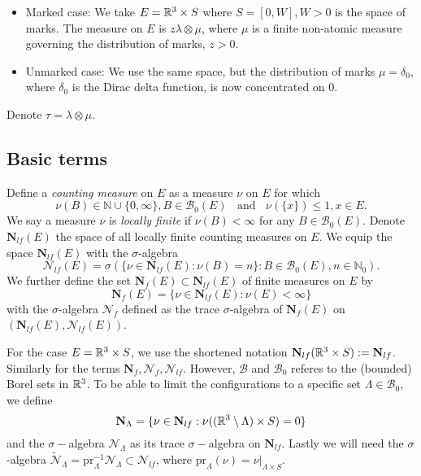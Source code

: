 \begin{itemize}
	\item Marked case: We take $E={\mathbb R^3}\times S$ where $S=[0,W],W>0$ is the space of marks. The measure on $E$ is $z\lambda \otimes \mu$, where $\mu$ is a finite non-atomic measure governing the distribution of marks, $z>0$. 
	\item Unmarked case: We use the same space, but the distribution of marks $\mu=\delta_0$, where $\delta_0$ is the Dirac delta function, is now concentrated on $0$.
\end{itemize}
Denote $\tau = \lambda \otimes \mu$.


\subsection{Basic terms}\label{sec:basicPP}
\begin{definition}\label{def:measures}
Define a \textit{counting measure} on $E$ as a measure $\nu$ on $E$ for which
$$\nu(B)\in\mathbb N \cup \{0,\infty\}, B\in\mathcal B_0(E)\;\;\text{ and } \; \; \nu(\{x\})\leq 1, x\in E.$$
We say a measure $\nu$ is \textit{locally finite} if $\nu(B)<\infty$ for any $B\in \mathcal  B_0(E)$. Denote $\mathbf N_{lf}(E)$ the space of all locally finite counting measures on $E$.
We equip the space $\mathbf N_{lf}(E)$ with the $\sigma$-algebra
$$\mathcal N_{lf}(E)=\sigma(\{\nu \in \mathbf N_{lf}(E): \nu(B)=n\}: B \in \mathcal B_0(E), n\in \mathbb N_0).$$
We further define the set $\mathbf N_f(E) \subset \mathbf N_{lf}(E)$ of finite measures on $E$ by
$$\mathbf N_f(E) = \{\nu \in \mathbf N_{lf}(E): \nu(E)<\infty\}$$
with the $\sigma$-algebra $\mathcal N_{f}$ defined as the trace $\sigma$-algebra of $\mathbf N_{f}(E)$ on $(\mathbf N_{lf}(E),\mathcal N_{lf}(E))$.\newline
\end{definition}

For the case $E={\mathbb R^3}\times S$, we use the shortened notation $\mathbf N_{lf}({\mathbb R^3}\times S) := \mathbf N_{lf}$. Similarly for the terms $\mathbf N_{f}, \mathcal N_{f}, \mathcal N_{lf}$. However, $\mathcal B$ and $\mathcal B_0$ referes to the (bounded) Borel sets in ${\mathbb R^3}$. To be able to limit the configurations to a specific set $\Lambda \in \mathcal B_0$, we define
$$\mathbf N_\Lambda = \{ \nu \in \mathbf N_{lf}: \nu( ({\mathbb R^3} \setminus \Lambda) \times S) = 0 \}$$
and the $\sigma-$algebra $\mathcal N_\Lambda$ as its trace $\sigma-$algebra on $\mathbf N_{lf}$. Lastly we will need the $\sigma$-algebra $\mathcal {\tilde N}_\Lambda = \mathrm{pr}_\Lambda^{-1} \mathcal N_\Lambda \subset \mathcal N_{lf}$, where $\mathrm{pr}_\Lambda(\nu)=\nu|_{\Lambda\times S}$.

